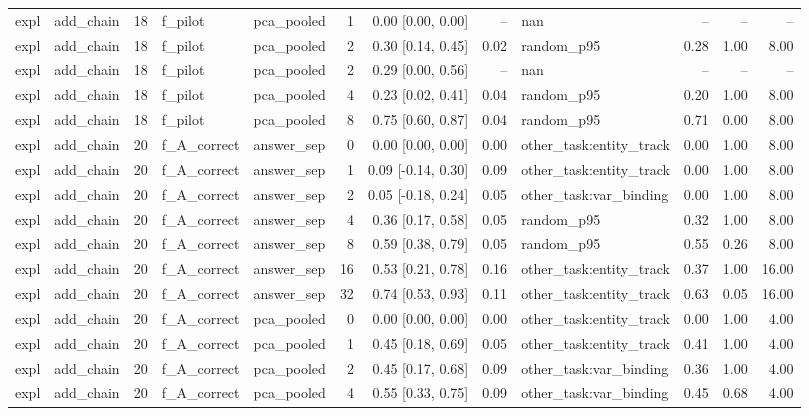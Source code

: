 \begin{tabular}{llrllrrrlrrr}
expl & add\_chain & 18 & f\_pilot & pca\_pooled & 1 & 0.00 [0.00, 0.00] & -- & nan & -- & -- & -- \\
expl & add\_chain & 18 & f\_pilot & pca\_pooled & 2 & 0.30 [0.14, 0.45] & 0.02 & random\_p95 & 0.28 & 1.00 & 8.00 \\
expl & add\_chain & 18 & f\_pilot & pca\_pooled & 2 & 0.29 [0.00, 0.56] & -- & nan & -- & -- & -- \\
expl & add\_chain & 18 & f\_pilot & pca\_pooled & 4 & 0.23 [0.02, 0.41] & 0.04 & random\_p95 & 0.20 & 1.00 & 8.00 \\
expl & add\_chain & 18 & f\_pilot & pca\_pooled & 8 & 0.75 [0.60, 0.87] & 0.04 & random\_p95 & 0.71 & 0.00 & 8.00 \\
expl & add\_chain & 20 & f\_A\_correct & answer\_sep & 0 & 0.00 [0.00, 0.00] & 0.00 & other\_task:entity\_track & 0.00 & 1.00 & 8.00 \\
expl & add\_chain & 20 & f\_A\_correct & answer\_sep & 1 & 0.09 [-0.14, 0.30] & 0.09 & other\_task:entity\_track & 0.00 & 1.00 & 8.00 \\
expl & add\_chain & 20 & f\_A\_correct & answer\_sep & 2 & 0.05 [-0.18, 0.24] & 0.05 & other\_task:var\_binding & 0.00 & 1.00 & 8.00 \\
expl & add\_chain & 20 & f\_A\_correct & answer\_sep & 4 & 0.36 [0.17, 0.58] & 0.05 & random\_p95 & 0.32 & 1.00 & 8.00 \\
expl & add\_chain & 20 & f\_A\_correct & answer\_sep & 8 & 0.59 [0.38, 0.79] & 0.05 & random\_p95 & 0.55 & 0.26 & 8.00 \\
expl & add\_chain & 20 & f\_A\_correct & answer\_sep & 16 & 0.53 [0.21, 0.78] & 0.16 & other\_task:entity\_track & 0.37 & 1.00 & 16.00 \\
expl & add\_chain & 20 & f\_A\_correct & answer\_sep & 32 & 0.74 [0.53, 0.93] & 0.11 & other\_task:entity\_track & 0.63 & 0.05 & 16.00 \\
expl & add\_chain & 20 & f\_A\_correct & pca\_pooled & 0 & 0.00 [0.00, 0.00] & 0.00 & other\_task:entity\_track & 0.00 & 1.00 & 4.00 \\
expl & add\_chain & 20 & f\_A\_correct & pca\_pooled & 1 & 0.45 [0.18, 0.69] & 0.05 & other\_task:entity\_track & 0.41 & 1.00 & 4.00 \\
expl & add\_chain & 20 & f\_A\_correct & pca\_pooled & 2 & 0.45 [0.17, 0.68] & 0.09 & other\_task:var\_binding & 0.36 & 1.00 & 4.00 \\
expl & add\_chain & 20 & f\_A\_correct & pca\_pooled & 4 & 0.55 [0.33, 0.75] & 0.09 & other\_task:var\_binding & 0.45 & 0.68 & 4.00 \\

\end{tabular}
